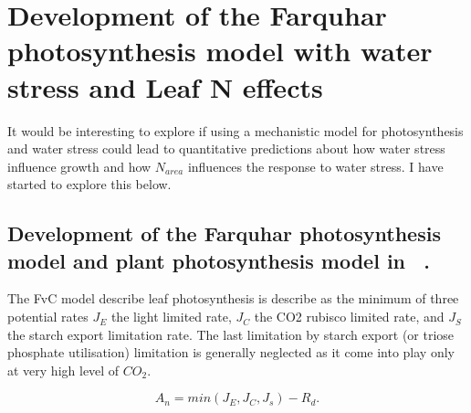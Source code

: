 \documentclass[a4paper,11pt]{article}
\begin{document}
\section{Development of the Farquhar photosynthesis model with water stress and Leaf N effects}


It would be interesting to explore if using a mechanistic model for
photosynthesis and water stress could lead to quantitative predictions
about how water stress influence growth and how $N_{area}$ influences the response to water stress. I have started to explore this below.


\subsection{Development of the Farquhar photosynthesis model and plant photosynthesis model in \plant\ .}

The FvC model describe leaf photosynthesis is describe as the minimum
of three potential rates $J_E$ the light limited rate, $J_C$ the CO2
rubisco limited rate, and $J_S$ the starch export limitation rate. The
last limitation by starch export (or triose phosphate utilisation)
limitation is generally neglected as it come into play only at very
high level of $CO_2$.

\begin{equation}
\label{eq:An}
A_n= min(J_E, J_C, J_s) - R_d.
\end{equation}





\end{document}
